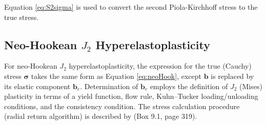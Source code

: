 \documentclass[sn-mathphys,Numbered]{sn-jnl}%
\newcommand{\bb}{\boldsymbol}
\begin{document}
\begin{appendices}
Equation \ref{eq:S2sigma} is used to convert the second Piola-Kirchhoff stress to the true stress.

\subsection{Neo-Hookean $J_2$ Hyperelastoplasticity}
For neo-Hookean $J_2$ hyperelastoplasticity, the expression for the true (Cauchy) stress $\bb{\sigma}$ takes the same form as Equation \ref{eq:neoHook}, except $\boldsymbol{b}$ is replaced by its elastic component $\boldsymbol{b}_e$.
Determination of $\boldsymbol{b}_e$ employs the definition of $J_2$ (Mises) plasticity in terms of a yield function, flow rule, Kuhn–Tucker loading/unloading conditions, and the consistency condition.
The stress calculation procedure (radial return algorithm) is described by \citet{Simo1998} (Box 9.1, page 319).


\end{appendices}
\end{document}
